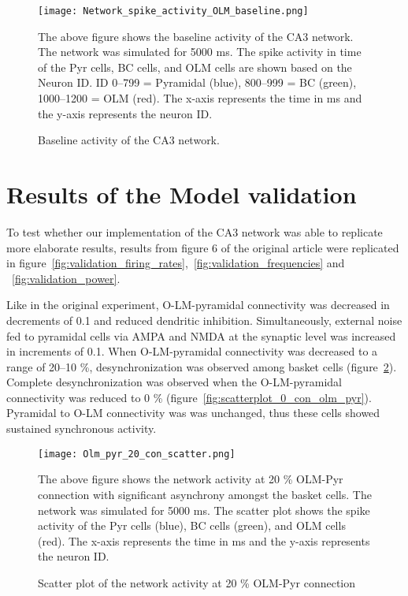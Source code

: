 \begin{figure}[htbp]
    \centering
    \texttt{[image: Network\_spike\_activity\_OLM\_baseline.png]}
    \caption[Baseline activity of the CA3 network]{Baseline activity of the CA3 network.}\label{fig:baseline_activity}
    \begin{minipage}{0.9\textwidth}
        The above figure shows the baseline activity of the CA3 network. The network was simulated for 5000 ms.
        The spike activity in time of the Pyr cells, BC cells, and OLM cells are shown based on the Neuron ID\@.
        ID 0--799 = Pyramidal (blue), 800--999 = BC (green), 1000--1200 = OLM (red).
        The x-axis represents the time in ms and the y-axis represents the neuron ID\@.
    \end{minipage}
\end{figure}
\pagebreak
\section{Results of the Model validation}
To test whether our implementation of the CA3 network was able to replicate
more elaborate results, results from figure 6 of the original
\textcite{sanjayImpairedDendriticInhibition2015} article were replicated in
figure~\ref{fig:validation_firing_rates},~\ref{fig:validation_frequencies} and
~\ref{fig:validation_power}.

Like in the original experiment, O-LM-pyramidal connectivity was decreased in decrements of 0.1 and reduced dendritic inhibition.
Simultaneously, external noise fed to pyramidal cells via AMPA and NMDA at the synaptic level was increased in increments of 0.1.
When O-LM-pyramidal connectivity was decreased to a range of 20--10 \%, desynchronization was observed among basket cells (figure~\ref{fig:scatterplot_20_con_olm_pyr}).
Complete desynchronization was observed when the O-LM-pyramidal connectivity was reduced to 0 \% (figure~\ref{fig:scatterplot_0_con_olm_pyr}).
Pyramidal to O-LM connectivity was was unchanged, thus these cells showed sustained synchronous activity.

\begin{figure}[htbp]
    \centering
    \texttt{[image: Olm\_pyr\_20\_con\_scatter.png]}
    \caption[20 \% OLM-Pyr connection scatter plot]{Scatter plot of the network activity at 20 \% OLM-Pyr connection}\label{fig:scatterplot_20_con_olm_pyr}
    \begin{minipage}{0.9\textwidth}
        The above figure shows the network activity at 20 \% OLM-Pyr connection with significant asynchrony amongst the basket cells.
        The network was simulated for 5000 ms.
        The scatter plot shows the spike activity of the Pyr cells (blue), BC cells (green), and OLM cells (red).
        The x-axis represents the time in ms and the y-axis represents the neuron ID\@.
    \end{minipage}
\end{figure}

